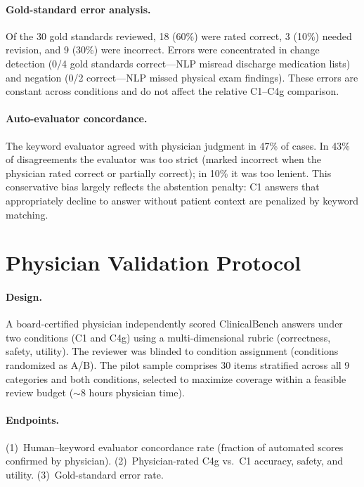 \paragraph{Gold-standard error analysis.}
Of the 30 gold standards reviewed, 18 (60\%) were rated correct, 3 (10\%) needed revision, and 9 (30\%) were incorrect.
Errors were concentrated in change detection (0/4 gold standards correct---NLP misread discharge medication lists) and negation (0/2 correct---NLP missed physical exam findings).
These errors are constant across conditions and do not affect the relative C1--C4g comparison.

\paragraph{Auto-evaluator concordance.}
The keyword evaluator agreed with physician judgment in 47\% of cases.
In 43\% of disagreements the evaluator was too strict (marked incorrect when the physician rated correct or partially correct); in 10\% it was too lenient.
This conservative bias largely reflects the abstention penalty: C1 answers that appropriately decline to answer without patient context are penalized by keyword matching.


\section{Physician Validation Protocol}
\label{app:physician_protocol}

\paragraph{Design.} A board-certified physician independently scored ClinicalBench answers under two conditions (C1 and C4g) using a multi-dimensional rubric (correctness, safety, utility).
The reviewer was blinded to condition assignment (conditions randomized as A/B).
The pilot sample comprises 30 items stratified across all 9 categories and both conditions, selected to maximize coverage within a feasible review budget (${\sim}8$ hours physician time).

\paragraph{Endpoints.} (1)~Human--keyword evaluator concordance rate (fraction of automated scores confirmed by physician).
(2)~Physician-rated C4g vs.\ C1 accuracy, safety, and utility.
(3)~Gold-standard error rate.

